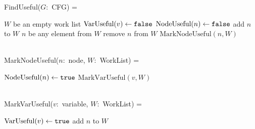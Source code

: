 
FindUseful($G$:~CFG) =
\begin{myalgorithmic}
\LET $W$ be an empty work list
 \STATE $\text{VarUseful}(v) \gets \texttt{false}$
\ENDFOR
{}
 \STATE $\text{NodeUseful}(n) \gets \texttt{false}$
  \STATE add $n$ to $W$
 \ENDIF
\ENDFOR
      \EMPTYLINE
{}
 \LET $n$ be any element from $W$
 \STATE remove $n$ from $W$
 \STATE $\text{MarkNodeUseful}(n, W)$
\ENDWHILE
\end{myalgorithmic}
~\\
MarkNodeUseful($n$:~node, $W$:~WorkList) =
\begin{myalgorithmic}
\STATE $\text{NodeUseful}(n) \gets \texttt{true}$
\STATE{}
\label{line:deadnode1}
  \STATE $\text{MarkVarUseful}(v, W)$\label{line:deadnode2}
 \ENDIF
\ENDFOR
\end{myalgorithmic}
~\\
MarkVarUseful($v$:~variable, $W$:~WorkList) =
\begin{myalgorithmic}
\STATE $\text{VarUseful}(v) \gets \texttt{true}$
\STATE{}
 \STATE{}
  \STATE add $n$ to $W$
 \ENDIF
\ENDFOR
\end{myalgorithmic}
